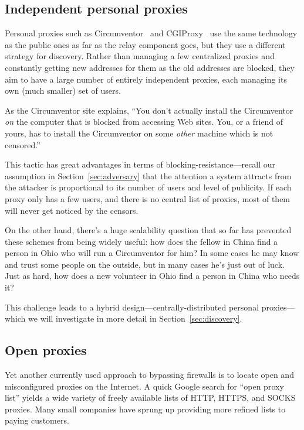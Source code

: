 \documentclass{llncs}
\begin{document}
\subsection{Independent personal proxies}

Personal proxies such as Circumventor~\cite{circumventor} and
CGIProxy~\cite{cgiproxy} use the same technology as the public ones as
far as the relay component goes, but they use a different strategy for
discovery. Rather than managing a few centralized proxies and constantly
getting new addresses for them as the old addresses are blocked, they
aim to have a large number of entirely independent proxies, each managing
its own (much smaller) set of users.

As the Circumventor site explains, ``You don't
actually install the Circumventor \emph{on} the computer that is blocked
from accessing Web sites. You, or a friend of yours, has to install the
Circumventor on some \emph{other} machine which is not censored.''

This tactic has great advantages in terms of blocking-resistance---recall
our assumption in Section~\ref{sec:adversary} that the attention
a system attracts from the attacker is proportional to its number of
users and level of publicity. If each proxy only has a few users, and
there is no central list of proxies, most of them will never get noticed by
the censors.

On the other hand, there's a huge scalability question that so far has
prevented these schemes from being widely useful: how does the fellow
in China find a person in Ohio who will run a Circumventor for him? In
some cases he may know and trust some people on the outside, but in many
cases he's just out of luck. Just as hard, how does a new volunteer in
Ohio find a person in China who needs it?


This challenge leads to a hybrid design---centrally-distributed
personal proxies---which we will investigate in more detail in
Section~\ref{sec:discovery}.

\subsection{Open proxies}

Yet another currently used approach to bypassing firewalls is to locate
open and misconfigured proxies on the Internet. A quick Google search
for ``open proxy list'' yields a wide variety of freely available lists
of HTTP, HTTPS, and SOCKS proxies. Many small companies have sprung up
providing more refined lists to paying customers.
\end{document}
